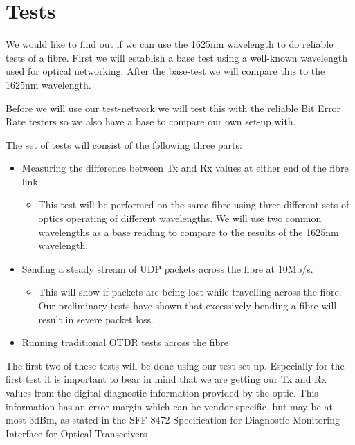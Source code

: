 \documentclass{article}
\begin{document}
\newpage
\section{Tests}
We would like to find out if we can use the 1625nm wavelength to do reliable tests of a fibre. First we will establish a base test using a well-known wavelength used for optical networking. After the base-test we will compare this to the 1625nm wavelength.

Before we will use our test-network we will test this with the reliable Bit Error Rate testers so we also have a base to compare our own set-up with.

The set of tests will consist of the following three parts:
\begin{itemize}
\item Measuring the difference between Tx and Rx values at either end of the fibre link.
	\begin{itemize}
	\item This test will be performed on the same fibre using three different sets of optics operating of different wavelengths.  We will use two common wavelengths as a base reading to compare to the results of the 1625nm wavelength.
	\end{itemize}
\item Sending a steady stream of UDP packets across the fibre at 10Mb/s.
	\begin{itemize}
	\item This will show if packets are being lost while travelling across the fibre. Our preliminary tests have shown that excessively bending a fibre will result in severe packet loss.
	\end{itemize}
\item Running traditional OTDR tests across the fibre
\end{itemize}

The first two of these tests will be done using our test set-up.
Especially for the first test it is important to bear in mind that we are getting our Tx and Rx values from the digital diagnostic information provided by the optic.
This information has an error margin which can be vendor specific, but may be at most 3dBm, as stated in the SFF-8472 Specification for
Diagnostic Monitoring Interface for Optical Transceivers\cite{SFF:DDM}
\end{document}
